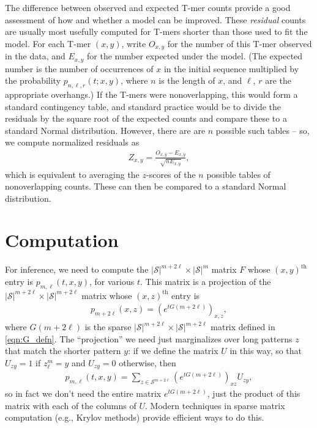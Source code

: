 \documentclass{article}
\newcommand{\calS}{\mathcal{S}}  %
\theoremstyle{plain}
\theoremstyle{definition}
\begin{document}
The difference between observed and expected T-mer counts provide a good assessment of how and whether a model can be improved.
These \emph{residual} counts are usually most usefully computed for T-mers shorter than those used to fit the model.
For each T-mer $(x,y)$, write $O_{x,y}$ for the number of this T-mer observed in the data, 
and $E_{x,y}$ for the number expected under the model.
(The expected number is the number of occurrences of $x$ in the initial sequence 
multiplied by the probability $p_{n,\ell,r}(t;x,y)$, where $n$ is the length of $x$,
and $\ell$, $r$ are the appropriate overhangs.)
If the T-mers were nonoverlapping, this would form a standard contingency table,
and standard practice would be to divide the residuals by the square root of the expected counts
and compare these to a standard Normal distribution.
However, there are are $n$ possible such tables --
so, we compute normalized residuals as
\begin{align}
    Z_{x,y} = \frac{ O_{x,y} - E_{x,y} }{ \sqrt{n E_{x,y}} },
\end{align}
which is equivalent to averaging the $z$-scores of the $n$ possible tables of nonoverlapping counts.
These can then be compared to a standard Normal distribution.

\section{Computation}

For inference, we need to compute the $|\calS|^{m+2\ell} \times |\calS|^m$ matrix $F$ whose $(x,y)^\text{th}$ entry is $p_{m,\ell}(t,x,y)$,
for various $t$.
This matrix is a projection of the $|\calS|^{m+2\ell} \times |\calS|^{m+2\ell}$ matrix whose $(x,z)^\text{th}$ entry is
\begin{align}
    p_{m+2\ell}(x,z) = \left( e^{t G(m+2\ell)} \right)_{x,z} ,
\end{align}
where $G(m+2\ell)$ is the sparse $|\calS|^{m+2\ell} \times |\calS|^{m+2\ell}$ matrix defined in \eqref{eqn:G_defn}.
The ``projection'' we need just marginalizes over long patterns $z$ that match the shorter pattern $y$:
if we define the matrix $U$ in this way, so that $U_{zy}=1$ if $z_\ell^m=y$ and $U_{zy}=0$ otherwise,
then
\begin{align} \label{eqn:Tmer_trans}
    p_{m,\ell}(t,x,y) = \sum_{z \in \calS^{m+2\ell}} \left( e^{t G(m+2\ell)} \right)_{xz} U_{zy} ,
\end{align}
so in fact we don't need the entire matrix $e^{t G(m+2\ell)}$,
just the product of this matrix with each of the columns of $U$.
Modern techniques in sparse matrix computation (e.g., Krylov methods) provide efficient ways to do this.
\end{document}
